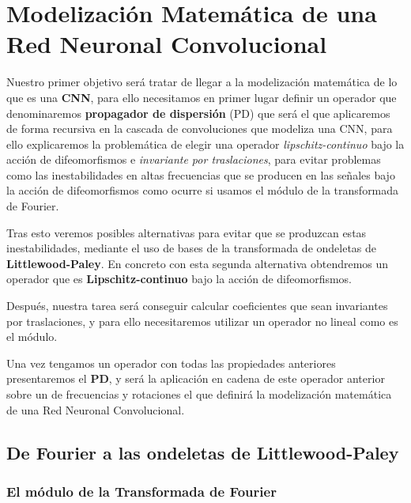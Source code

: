 


\chapter{Modelización Matemática de una Red Neuronal Convolucional} \label{ch:seccion12}

\noindent Nuestro primer objetivo será tratar de llegar a la modelización matemática de lo que es una \textbf{CNN}, para ello necesitamos en primer lugar definir un operador que denominaremos \textbf{propagador de dispersión} (PD) que será el que aplicaremos de forma recursiva en la cascada de convoluciones que modeliza una CNN, para ello explicaremos la problemática de elegir una operador \textit{lipschitz-continuo} bajo la acción de difeomorfismos e \textit{invariante por traslaciones}, para evitar problemas como las inestabilidades en altas frecuencias que se producen en las señales bajo la acción de difeomorfismos como ocurre si usamos el módulo de la transformada de Fourier. 

\medskip

\noindent Tras esto  veremos posibles alternativas para evitar que se produzcan estas inestabilidades, mediante el uso de bases de la transformada de ondeletas de \textbf{Littlewood-Paley}. En concreto con esta segunda alternativa obtendremos un operador que es \textbf{Lipschitz-continuo} bajo la acción de difeomorfismos. 

\medskip

\noindent Después, nuestra tarea será conseguir calcular coeficientes que sean invariantes por traslaciones, y para ello necesitaremos utilizar un operador no lineal como es el módulo. 

\medskip

\noindent Una vez tengamos un operador con todas las propiedades anteriores presentaremos el \textbf{PD}, y será la aplicación en cadena de este operador anterior sobre un  de frecuencias y rotaciones el que definirá la modelización matemática de una Red Neuronal Convolucional.


\section{De Fourier a las ondeletas de Littlewood-Paley}

\subsection{El módulo de la Transformada de Fourier}

